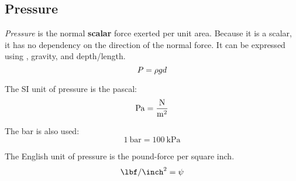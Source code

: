 \subsection{Pressure}\label{subsec:Pressure}
\begin{definition}[Pressure]\label{def:Pressure}
  \emph{Pressure} is the normal \textbf{scalar} force exerted per unit area.
  Because it is a scalar, it has no dependency on the direction of the normal force.
  It can be expressed using , gravity, and depth/length.
  \begin{equation}\label{eq:Pressure}
    P = \rho g d
  \end{equation}

  The SI unit of pressure is the pascal:
  \begin{equation}\label{eq:Pressure_Pascal}
    \si{\pascal} = \si[per-mode=fraction]{\newton\per\meter\squared}
  \end{equation}

  The bar is also used:
  \begin{equation*}
    \SI{1}{\bar} = \SI{100}{\kilo\pascal}
  \end{equation*}

  The English unit of pressure is the pound-force per square inch.
  \begin{equation}\label{eq:Pressure_Bar}
    \si[per-mode=symbol]{\lbf\per\inch\squared} = \si{\psi}
  \end{equation}
\end{definition}


